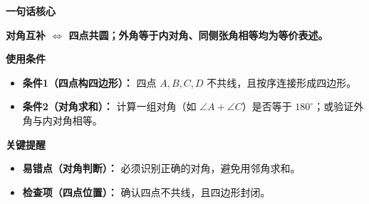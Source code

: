 \begin{summarybox}
	\textbf{\textcolor{CSummary}{一句话核心}}

	\textbf{对角互补 $\Leftrightarrow$ 四点共圆；外角等于内对角、同侧张角相等均为等价表述。}

	\medskip
	\textbf{\textcolor{CSummary}{使用条件}}
	\begin{itemize}[leftmargin=*, itemsep=0.5em, topsep=0.4em]
		\item \textbf{条件1（四点构四边形）：} 四点 $A,B,C,D$ 不共线，且按序连接形成四边形。
		\item \textbf{条件2（对角求和）：} 计算一组对角（如 $\angle A+\angle C$）是否等于 $180^\circ$；或验证外角与内对角相等。
	\end{itemize}

	\medskip
	\textbf{\textcolor{CSummary}{关键提醒}}
	\begin{itemize}[leftmargin=*, itemsep=0.5em, topsep=0.4em]
		\item \textbf{易错点（对角判断）：} 必须识别正确的对角，避免用邻角求和。
		\item \textbf{检查项（四点位置）：} 确认四点不共线，且四边形封闭。
	\end{itemize}
\end{summarybox}
